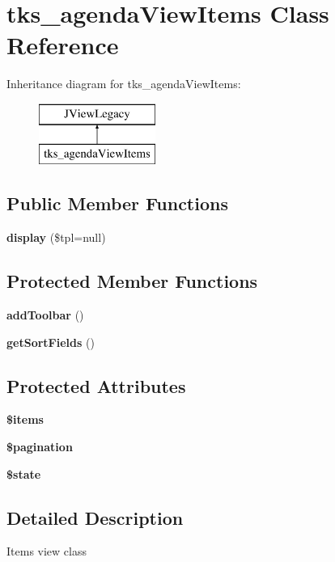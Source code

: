 \section{tks\+\_\+agenda\+View\+Items Class Reference}
\label{classtks__agenda_view_items}
Inheritance diagram for tks\+\_\+agenda\+View\+Items\+:\begin{figure}[H]
\begin{center}
\leavevmode
\includegraphics[height=2.000000cm]{classtks__agenda_view_items}
\end{center}
\end{figure}
\subsection*{Public Member Functions}
\begin{DoxyCompactItemize}
\item 
\textbf{ display} (\$tpl=null)
\end{DoxyCompactItemize}
\subsection*{Protected Member Functions}
\begin{DoxyCompactItemize}
\item 
\textbf{ add\+Toolbar} ()
\item 
\textbf{ get\+Sort\+Fields} ()
\end{DoxyCompactItemize}
\subsection*{Protected Attributes}
\begin{DoxyCompactItemize}
\item 
\textbf{ \$items}
\item 
\textbf{ \$pagination}
\item 
\textbf{ \$state}
\end{DoxyCompactItemize}


\subsection{Detailed Description}
Items view class 

